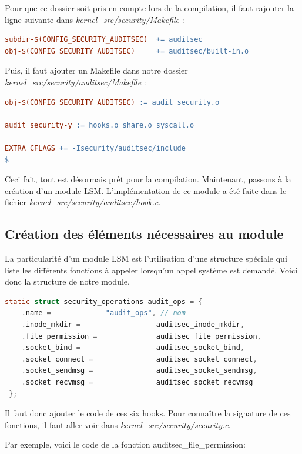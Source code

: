 \documentclass[pdftex,a4paper,titlepage,11pt]{article}
\begin{document}
 Pour que ce dossier soit pris en compte lors de la compilation, il faut rajouter la ligne suivante dans \textit{{kernel\_src}/security/Makefile} :

\begin{lstlisting}[language=make]
subdir-$(CONFIG_SECURITY_AUDITSEC)  += auditsec	
obj-$(CONFIG_SECURITY_AUDITSEC)     += auditsec/built-in.o
\end{lstlisting}

Puis, il faut ajouter un Makefile dans notre dossier \textit{{kernel\_src}/security/auditsec/Makefile} :

\begin{lstlisting}[language=make]
obj-$(CONFIG_SECURITY_AUDITSEC) := audit_security.o
 
audit_security-y := hooks.o share.o syscall.o

EXTRA_CFLAGS += -Isecurity/auditsec/include
$\end{lstlisting}

Ceci fait, tout est désormais prêt pour la compilation. Maintenant, passons à la création d'un module LSM. L'implémentation de ce module a été faite dans le fichier \textit{{kernel\_src}/security/auditsec/hook.c}. 

\subsection{Création des éléments nécessaires au module}

La particularité d'un module LSM est l'utilisation d'une structure spéciale qui liste les différents fonctions à appeler lorsqu'un appel système est demandé. Voici donc la structure de notre module.

\begin{lstlisting}[language=C]
static struct security_operations audit_ops = {
	.name =             "audit_ops", // nom 
	.inode_mkdir =                  auditsec_inode_mkdir,
	.file_permission =              auditsec_file_permission,
	.socket_bind =                  auditsec_socket_bind,
	.socket_connect =               auditsec_socket_connect,
	.socket_sendmsg =               auditsec_socket_sendmsg,
 	.socket_recvmsg =               auditsec_socket_recvmsg
 };
\end{lstlisting}

Il faut donc ajouter le code de ces six hooks. Pour connaître la signature de ces fonctions, il faut aller voir dans \textit{{kernel\_src}/security/security.c}. 

Par exemple, voici le code de la fonction auditsec\_file\_permission:
\end{document}
